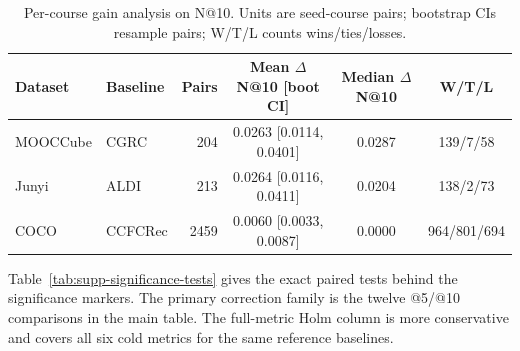 \begin{table}[t]
\centering
\caption{Per-course gain analysis on N@10. Units are seed-course pairs; bootstrap CIs resample pairs; W/T/L counts wins/ties/losses.}
\label{tab:supp-per-course-gain}
\tablecaptiongap
\small
\setlength{\tabcolsep}{3.8pt}
\begin{tabular*}{\textwidth}{@{\extracolsep{\fill}}llrccc}
\toprule
Dataset & Baseline & Pairs & Mean \(\Delta\)N@10 [boot CI] & Median \(\Delta\)N@10 & W/T/L \\
\midrule
MOOCCube & CGRC & 204 & 0.0263 [0.0114, 0.0401] & 0.0287 & 139/7/58 \\
Junyi & ALDI & 213 & 0.0264 [0.0116, 0.0411] & 0.0204 & 138/2/73 \\
COCO & CCFCRec & 2459 & 0.0060 [0.0033, 0.0087] & 0.0000 & 964/801/694 \\
\bottomrule
\end{tabular*}
\end{table}

Table~\ref{tab:supp-significance-tests} gives the exact paired tests behind the significance markers. The primary correction family is the twelve @5/@10 comparisons in the main table. The full-metric Holm column is more conservative and covers all six cold metrics for the same reference baselines.

